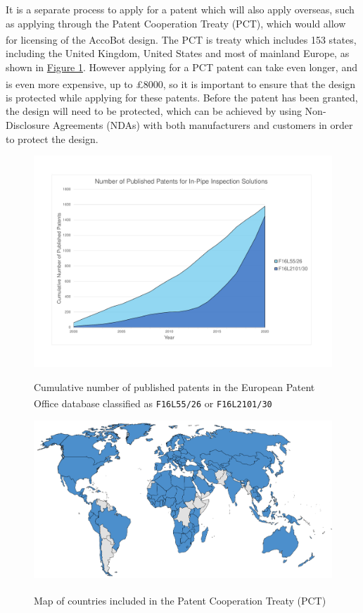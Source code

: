 \documentclass[11pt]{article}		%
\newlength{\imageheight}	 %
\newcommand{\supercite}[1]{\textsuperscript{\cite{#1}}}		%
\newcommand{\figref}[1]{\hyperref[#1]{Figure \ref*{#1}}}    %
\begin{document}
		It is a separate process to apply for a patent which will also apply overseas, such as applying through the Patent Cooperation Treaty (PCT), which would allow for licensing of the AccoBot design.
		The PCT is treaty which includes 153 states\supercite{pct2020states}, including the United Kingdom, United States and most of mainland Europe, as shown in \figref{pctMap}.
		However applying for a PCT patent can take even longer, and is even more expensive, up to £8000\supercite{mewburn2020international}, so it is important to ensure that the design is protected while applying for these patents.
		Before the patent has been granted, the design will need to be protected, which can be achieved by using Non-Disclosure Agreements (NDAs) with both manufacturers and customers in order to protect the design.
		\begin{figure}[h]
			\centering
			\begin{multicols}{2}
				\includegraphics[height=\imageheight]{patentGraph}
				\caption{Cumulative number of published patents in the European Patent Office database classified as \texttt{F16L55/26}\supercite{patent26} or \texttt{F16L2101/30}\supercite{patent30}}
				\label{patentGraph}
				\columnbreak
				\includegraphics[height=\imageheight]{pctMap}
				\caption{Map of countries included in the Patent Cooperation Treaty (PCT)\supercite{pct2020states}}
				\label{pctMap}
			\end{multicols}
		\end{figure}
	
\end{document}
